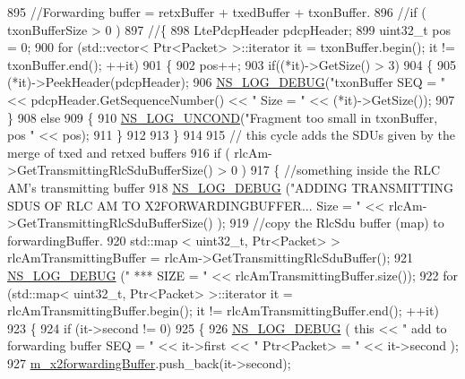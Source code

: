 \begin{DoxyCode}
895     \textcolor{comment}{//Forwarding buffer = retxBuffer + txedBuffer + txonBuffer.}
896     \textcolor{comment}{//if ( txonBufferSize > 0 )}
897     \textcolor{comment}{//\{}
898       LtePdcpHeader pdcpHeader;
899       uint32\_t pos = 0;
900       \textcolor{keywordflow}{for} (std::vector< Ptr<Packet> >::iterator it = txonBuffer.begin(); it != txonBuffer.end(); ++it)
901       \{
902         pos++;
903         \textcolor{keywordflow}{if}((*it)->GetSize() > 3) 
904         \{
905           (*it)->PeekHeader(pdcpHeader);
906           \hyperlink{group__logging_ga413f1886406d49f59a6a0a89b77b4d0a}{NS\_LOG\_DEBUG}(\textcolor{stringliteral}{"txonBuffer SEQ = "} << pdcpHeader.GetSequenceNumber() << \textcolor{stringliteral}{" Size = "} << 
      (*it)->GetSize());
907         \}
908         \textcolor{keywordflow}{else}
909         \{
910           \hyperlink{log-macros-disabled_8h_a0b36e5e182b37194f85ef1c5e979fb2e}{NS\_LOG\_UNCOND}(\textcolor{stringliteral}{"Fragment too small in txonBuffer, pos "} << pos);
911         \}
912           
913       \}
914 
915       \textcolor{comment}{// this cycle adds the SDUs given by the merge of txed and retxed buffers}
916       \textcolor{keywordflow}{if} ( rlcAm->GetTransmittingRlcSduBufferSize() > 0 )
917       \{ \textcolor{comment}{//something inside the RLC AM's transmitting buffer }
918         \hyperlink{group__logging_ga413f1886406d49f59a6a0a89b77b4d0a}{NS\_LOG\_DEBUG} (\textcolor{stringliteral}{"ADDING TRANSMITTING SDUS OF RLC AM TO X2FORWARDINGBUFFER... Size = "} << 
      rlcAm->GetTransmittingRlcSduBufferSize() );
919         \textcolor{comment}{//copy the RlcSdu buffer (map) to forwardingBuffer.}
920         std::map < uint32\_t, Ptr<Packet> > rlcAmTransmittingBuffer = rlcAm->GetTransmittingRlcSduBuffer();
921         \hyperlink{group__logging_ga413f1886406d49f59a6a0a89b77b4d0a}{NS\_LOG\_DEBUG} (\textcolor{stringliteral}{" *** SIZE = "} << rlcAmTransmittingBuffer.size());
922         \textcolor{keywordflow}{for} (std::map< uint32\_t, Ptr<Packet> >::iterator it = rlcAmTransmittingBuffer.begin(); it != 
      rlcAmTransmittingBuffer.end(); ++it)
923         \{
924           \textcolor{keywordflow}{if} (it->second != 0)
925           \{
926             \hyperlink{group__logging_ga413f1886406d49f59a6a0a89b77b4d0a}{NS\_LOG\_DEBUG} ( \textcolor{keyword}{this} << \textcolor{stringliteral}{" add to forwarding buffer SEQ = "} << it->first << \textcolor{stringliteral}{"
       Ptr<Packet> = "} << it->second );
927             \hyperlink{classns3_1_1UeManager_a3fb8a9dc6ef434306f90f42837f3ae83}{m\_x2forwardingBuffer}.push\_back(it->second);

\end{DoxyCode}
